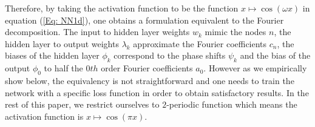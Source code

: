 \documentclass[AMS,STIX1COL]{WileyNJD-v2}
\begin{document}
Therefore, by taking the activation function to be the function $x \mapsto \cos(\omega x)$ in equation (\ref{Eq: NN1d}), one obtains a formulation equivalent to the Fourier decomposition. The input to hidden layer weights $w_k$ mimic the nodes $n$, the hidden layer to output weights $\lambda_k$ approximate the Fourier coefficients $c_n$, the biases of the hidden layer $\phi_k$ correspond to the phase shifts $\psi_k$ and the bias of the output $\phi_0$ to half the $0th$ order Fourier coefficients $a_0$. However as we empirically show below, the equivalency is not straightforward and one needs to train the network with a specific loss function in order to obtain satisfactory results. In the rest of this paper, we restrict ourselves to $2$-periodic function which means the activation function is $x \mapsto \cos(\pi x)$.


\end{document}

